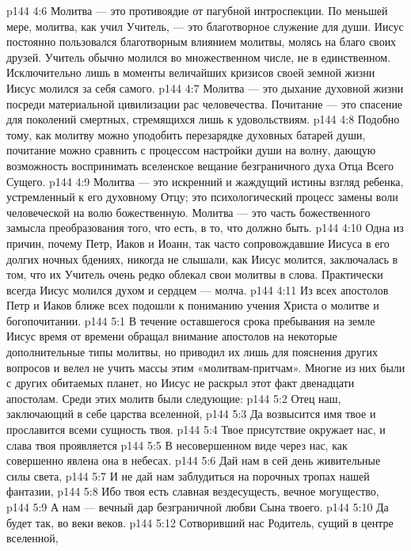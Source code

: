 \vs p144 4:6 Молитва --- это противоядие от пагубной интроспекции. По меньшей мере, молитва, как учил Учитель, --- это благотворное служение для души. Иисус постоянно пользовался благотворным влиянием молитвы, молясь на благо своих друзей. Учитель обычно молился во множественном числе, не в единственном. Исключительно лишь в моменты величайших кризисов своей земной жизни Иисус молился за себя самого.
\vs p144 4:7 Молитва --- это дыхание духовной жизни посреди материальной цивилизации рас человечества. Почитание --- это спасение для поколений смертных, стремящихся лишь к удовольствиям.
\vs p144 4:8 Подобно тому, как молитву можно уподобить перезарядке духовных батарей души, почитание можно сравнить с процессом настройки души на волну, дающую возможность воспринимать вселенское вещание безграничного духа Отца Всего Сущего.
\vs p144 4:9 Молитва --- это искренний и жаждущий истины взгляд ребенка, устремленный к его духовному Отцу; это психологический процесс замены воли человеческой на волю божественную. Молитва --- это часть божественного замысла преобразования того, что есть, в то, что должно быть.
\vs p144 4:10 Одна из причин, почему Петр, Иаков и Иоанн, так часто сопровождавшие Иисуса в его долгих ночных бдениях, никогда не слышали, как Иисус молится, заключалась в том, что их Учитель очень редко облекал свои молитвы в слова. Практически всегда Иисус молился духом и сердцем --- молча.
\vs p144 4:11 Из всех апостолов Петр и Иаков ближе всех подошли к пониманию учения Христа о молитве и богопочитании.
\vs p144 5:1 В течение оставшегося срока пребывания на земле Иисус время от времени обращал внимание апостолов на некоторые дополнительные типы молитвы, но приводил их лишь для пояснения других вопросов и велел не учить массы этим «молитвам\hyp{}притчам». Многие из них были с других обитаемых планет, но Иисус не раскрыл этот факт двенадцати апостолам. Среди этих молитв были следующие:
\vsetoff
\vs p144 5:2 Отец наш, заключающий в себе царства вселенной,
\vs p144 5:3 \hsetoff Да возвысится имя твое и прославится всеми сущность твоя.
\vs p144 5:4 Твое присутствие окружает нас, и слава твоя проявляется
\vs p144 5:5 \hsetoff В несовершенном виде через нас, как совершенно явлена она в небесах.
\vs p144 5:6 Дай нам в сей день живительные силы света,
\vs p144 5:7 \hsetoff И не дай нам заблудиться на порочных тропах нашей фантазии,
\vs p144 5:8 Ибо твоя есть славная вездесущесть, вечное могущество,
\vs p144 5:9 \hsetoff А нам --- вечный дар безграничной любви Сына твоего.
\vs p144 5:10 Да будет так, во веки веков.
\separatorline
\vs p144 5:12 Сотворивший нас Родитель, сущий в центре вселенной,
